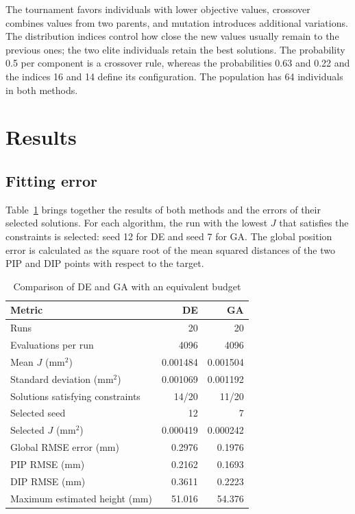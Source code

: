 \documentclass[conference,letterpaper]{IEEEtran}
\begin{document}
The tournament favors individuals with lower objective values, crossover combines values from two parents, and mutation introduces additional variations. The distribution indices control how close the new values usually remain to the previous ones; the two elite individuals retain the best solutions. The probability 0.5 per component is a crossover rule, whereas the probabilities 0.63 and 0.22 and the indices 16 and 14 define its configuration. The population has 64 individuals in both methods.

\section{Results}
\subsection{Fitting error}
Table~\ref{tab:resultados} brings together the results of both methods and the errors of their selected solutions. For each algorithm, the run with the lowest $J$ that satisfies the constraints is selected: seed 12 for DE and seed 7 for GA. The global position error is calculated as the square root of the mean squared distances of the two PIP and DIP points with respect to the target.

\begin{table}[t]
\caption{Comparison of DE and GA with an equivalent budget}
\label{tab:resultados}\centering\footnotesize
\begin{tabular}{lrr}\toprule Metric & DE & GA\\\midrule
Runs &20&20\\ Evaluations per run &4096&4096\\
Mean $J$ (mm$^2$)&0.001484&0.001504\\
Standard deviation (mm$^2$)&0.001069&0.001192\\
Solutions satisfying constraints&14/20&11/20\\\midrule
Selected seed&12&7\\
Selected $J$ (mm$^2$)&0.000419&0.000242\\
Global RMSE error (mm)&0.2976&0.1976\\
PIP RMSE (mm)&0.2162&0.1693\\
DIP RMSE (mm)&0.3611&0.2223\\
Maximum estimated height (mm)&51.016&54.376\\\bottomrule
\end{tabular}
\end{table}
\end{document}
